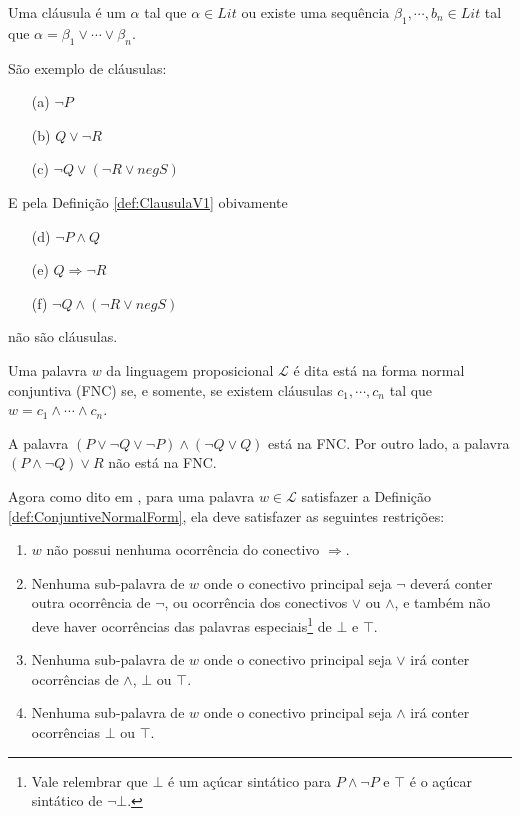 \begin{definicao}[Clásulas]\label{def:ClausulaV1}
  Uma cláusula é um $\alpha$ tal que $\alpha \in Lit$ ou existe uma sequência $\beta_1, \cdots, b_n \in Lit$ tal que $\alpha = \beta_1 \lor \cdots \lor \beta_n$.
\end{definicao}

\begin{exemplo}
  São exemplo de cláusulas:
  \begin{itemize}
    \item[(a)] $\neg P$
    \item[(b)] $Q \lor \neg R$
    \item[(c)] $\neg Q \lor (\neg R \lor neg S)$
  \end{itemize}
  E pela Definição \ref{def:ClausulaV1} obivamente
  \begin{itemize}
    \item[(d)] $\neg P \land Q$
    \item[(e)] $Q \Rightarrow \neg R$
    \item[(f)] $\neg Q \land (\neg R \lor neg S)$
  \end{itemize}
  não são cláusulas.
\end{exemplo}

\begin{definicao}\label{def:ConjuntiveNormalForm}
  Uma palavra $w$ da linguagem proposicional $\mathcal{L}$ é dita está na forma normal conjuntiva (FNC) se, e somente, se existem cláusulas $c_1, \cdots, c_n$ tal que $w = c_1 \land \cdots \land c_n$.
\end{definicao}

\begin{exemplo}
  A palavra $(P \lor \neg Q \lor \neg P) \land (\neg Q \lor Q)$ está na FNC. Por outro lado, a palavra $(P \land \neg Q) \lor R$ não está na FNC.
\end{exemplo}

Agora como dito em \cite{benja-Logica}, para uma palavra $w \in \mathcal{L}$ satisfazer a Definição \ref{def:ConjuntiveNormalForm}, ela deve satisfazer as seguintes restrições:

\begin{enumerate}
  \item $w$ não possui nenhuma ocorrência do conectivo $\Rightarrow$.
  \item Nenhuma sub-palavra de $w$ onde o conectivo principal seja $\neg$ deverá conter outra ocorrência de $\neg$, ou ocorrência dos conectivos $\lor$ ou $\land$, e também não deve haver ocorrências das palavras especiais\footnote{Vale relembrar que $\bot$ é um açúcar sintático para $P \land \neg P$ e $\top$ é o açúcar sintático de $\neg \bot$.} de $\bot$ e $\top$.
  \item Nenhuma sub-palavra de $w$ onde o conectivo principal seja $\lor$ irá conter ocorrências de $\land$, $\bot$ ou $\top$.
  \item Nenhuma sub-palavra de $w$ onde o conectivo principal seja $\land$ irá conter ocorrências $\bot$ ou $\top$.
\end{enumerate}

